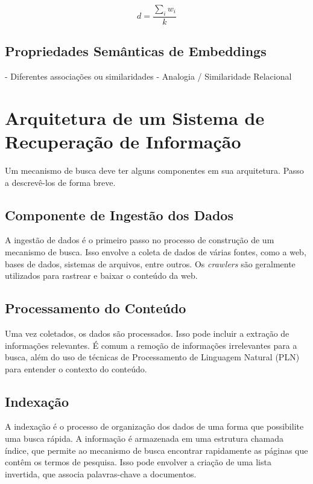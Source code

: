\documentclass[
	12pt,				%
	openright,			%
	oneside,			%
	a4paper,			%
	english,			%
	french,				%
	spanish,			%
	brazil				%
	]{abntex2}
\begin{document}
$$d = \frac{\sum_{i}w_{i}}{k}$$


\subsection{Propriedades Semânticas de Embeddings}
\label{subsec:propriedades-semanticas-de-embeddings}

- Diferentes associações ou similaridades
- Analogia / Similaridade Relacional


\section{Arquitetura de um Sistema de Recuperação de Informação}
\label{sec:arquitetura-de-um-sistema-de-recuperacao-de-informacao}

Um mecanismo de busca deve ter alguns componentes em sua arquitetura. Passo a descrevê-los de forma breve.

\subsection{Componente de Ingestão dos Dados}
\label{subsec:componente-de-ingestao-dos-dados}

A ingestão de dados é o primeiro passo no processo de construção de um mecanismo de busca.
Isso envolve a coleta de dados de várias fontes, como a web, bases de dados, sistemas de arquivos, entre outros.
Os \textit{crawlers} são geralmente utilizados para rastrear e baixar o conteúdo da web.

\subsection{Processamento do Conteúdo}\label{subsec:processamento-do-conteudo}
Uma vez coletados, os dados são processados. Isso pode incluir a extração de informações relevantes.
É comum a remoção de informações irrelevantes para a busca, além do uso de técnicas de Processamento de
Linguagem Natural (PLN) para entender o contexto do conteúdo.

\subsection{Indexação}\label{subsec:indexacao}
A indexação é o processo de organização dos dados de uma forma que possibilite uma busca rápida.
A informação é armazenada em uma estrutura chamada índice, que permite ao mecanismo de busca encontrar
rapidamente as páginas que contêm os termos de pesquisa. Isso pode envolver a criação de uma lista invertida,
que associa palavras-chave a documentos.
\end{document}
